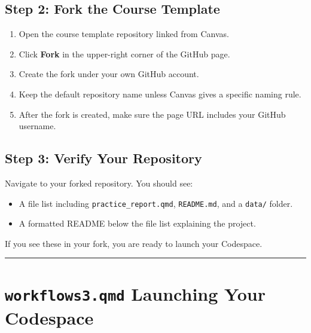 \documentclass[
  letterpaper,
  DIV=11,
  numbers=noendperiod,
  oneside]{scrreprt}
\providecommand{\tightlist}{%
  \setlength{\itemsep}{0pt}\setlength{\parskip}{0pt}}
\begin{document}
\subsection*{Step 2: Fork the Course
Template}\label{step-2-fork-the-course-template}

\begin{enumerate}
\def\labelenumi{\arabic{enumi}.}
\tightlist
\item
  Open the course template repository linked from Canvas.
\item
  Click \textbf{Fork} in the upper-right corner of the GitHub page.
\item
  Create the fork under your own GitHub account.
\item
  Keep the default repository name unless Canvas gives a specific naming
  rule.
\item
  After the fork is created, make sure the page URL includes your GitHub
  username.
\end{enumerate}

\subsection*{Step 3: Verify Your
Repository}\label{step-3-verify-your-repository}

Navigate to your forked repository. You should see:

\begin{itemize}
\tightlist
\item
  A file list including \texttt{practice\_report.qmd},
  \texttt{README.md}, and a \texttt{data/} folder.
\item
  A formatted README below the file list explaining the project.
\end{itemize}

If you see these in your fork, you are ready to launch your Codespace.

\begin{center}\rule{0.5\linewidth}{0.5pt}\end{center}

\section*{\texorpdfstring{\texttt{workflows3.qmd} Launching Your
Codespace}{workflows3.qmd Launching Your Codespace}}\label{workflows3.qmd-launching-your-codespace}
\end{document}
